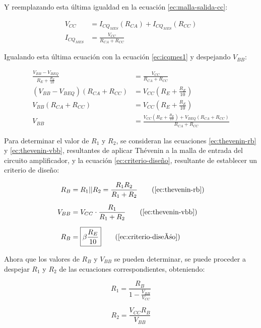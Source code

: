 Y reemplazando esta última igualdad en la ecuación \ref{ec:malla-salida-cc}:

\begin{align}
    V_{CC} &= I_{CQ_{MES}}(R_{CA}) + I_{CQ_{MES}}(R_{CC}) \nonumber\\[6pt]
    I_{CQ_{MES}} &= \frac{V_{CC}}{R_{CA} + R_{CC}} \label{ec:icqmes2}
\end{align}

Igualando esta última ecuación con la ecuación \ref{ec:icqmes1} y despejando $V_{BB}$:

\begin{align}
   \frac{V_{BB} - V_{BEQ}} {R_E + \frac{R_E}{10}} &= \frac{V_{CC}}{R_{CA}+R_{CC}} \nonumber\\[6pt]
   (V_{BB} - V_{BEQ})(R_{CA}+R_{CC}) &= V_{CC}(R_E +\frac{R_E}{10})\nonumber\\[6pt]
   V_{BB}(R_{CA}+R_{CC}) &= V_{CC}(R_E +\frac{R_E}{10}) \nonumber\\[6pt]
   V_{BB} &= \boxed{\frac{V_{CC}(R_E +\frac{R_E}{10}) + V_{BEQ}(R_{CA}+R_{CC})}{R_{CA}+R_{CC}}} \label{ec:calculo-vbb}
\end{align}

Para determinar el valor de $R_1$ y $R_2$, se consideran las ecuaciones \ref{ec:thevenin-rb} y \ref{ec:thevenin-vbb}, resultantes de aplicar Thévenin a la malla de entrada del circuito 
amplificador, y la ecuación \ref{ec:criterio-diseño},
resultante de establecer un criterio de diseño:

\begin{align*}
    R_B &= R_1||R_2=\frac{R_1 R_2}{R_1 + R_2} \tag{\ref{ec:thevenin-rb}}\\[6pt]
    V_{BB} &= V_{CC} \cdot \frac{R_1}{R_1 + R_2} \tag{\ref{ec:thevenin-vbb}}\\[6pt]
    R_B &= \boxed{\beta \frac{R_E}{10}} \tag{\ref{ec:criterio-diseño}}
\end{align*}

Ahora que los valores de $R_B$ y $V_{BB}$ se pueden determinar, se puede proceder a 
despejar $R_1$ y  $R_2$ de las ecuaciones correspondientes, obteniendo:

\begin{center}
    \begin{minipage}{0.2\textwidth}
    \begin{equation*}
        \boxed{R_1 = \frac{R_B}{1-\frac{V_{BB}}{V_{CC}}}}
    \end{equation*}
    \end{minipage}
    \begin{minipage}{0.2\textwidth}
    \begin{equation*}
        \boxed{R_2 = \frac{V_{CC}R_B}{V_{BB}}}
    \end{equation*}
    \end{minipage}
\end{center}


